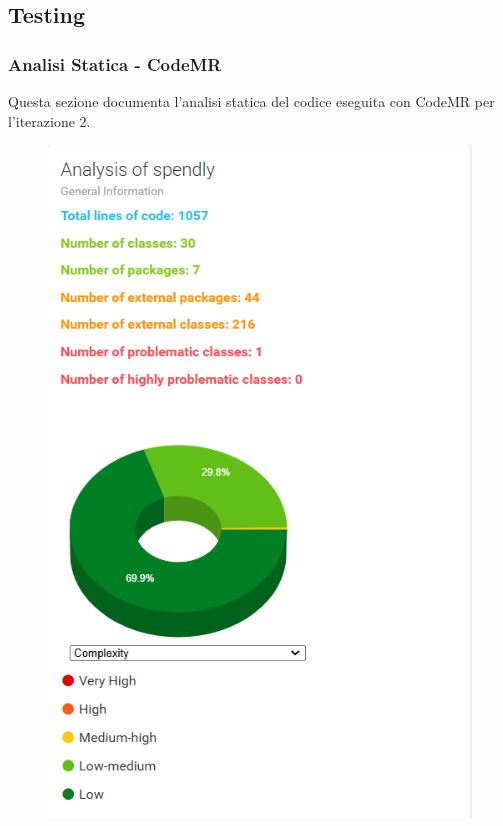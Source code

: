 \subsection{Testing}
\subsubsection{Analisi Statica - CodeMR}

Questa sezione documenta l'analisi statica del codice eseguita con CodeMR per l'iterazione 2.

\begin{figure}[H]
    \centering
    \begin{minipage}{0.45\textwidth}
        \centering
        \includegraphics[width=\textwidth]{images/Complexity_iter2.png}

\end{minipage}
\end{figure}
